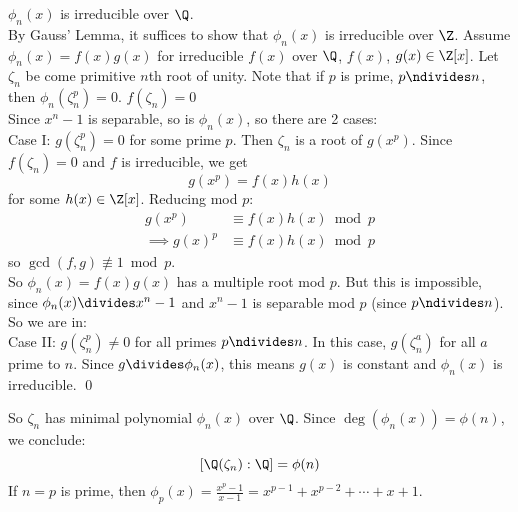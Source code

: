 \thm $\phi_n(x)$ is irreducible over $\Q$. \\
\pf By Gauss' Lemma, it suffices to show that $\phi_n(x)$ is irreducible over $\Z$.  Assume $\phi_n(x)=f(x)g(x)$ for irreducible $f(x)$ over $\Q$, $f(x)$, $g(x)\in\Z[x]$.  Let $\zeta_n$ be come primitive $n$th root of unity.  Note that if $p$ is prime, $p\ndivides n$, then $\phi_n(\zeta_n^p)=0$.  $f(\zeta_n)=0$ \\
Since $x^n-1$ is separable, so is $\phi_n(x)$, so there are 2 cases: \\
Case I: $g(\zeta_n^p)=0$ for some prime $p$.  Then $\zeta_n$ is a root of $g(x^p)$.  Since $f(\zeta_n)=0$ and $f$ is irreducible, we get
\[ g(x^p) = f(x)h(x) \]
for some $h(x)\in\Z[x]$.  Reducing mod $p$:
\begin{align*}
g(x^p) &\equiv f(x)h(x) \bmod p \\
\implies g(x)^p &\equiv f(x)h(x) \bmod p
\end{align*}
so $\gcd(f,g)\nequiv1\bmod p$. \\
So $\phi_n(x)=f(x)g(x)$ has a multiple root mod $p$.  But this is impossible, since $\phi_n(x)\divides x^n-1$ and $x^n-1$ is separable mod $p$ (since $p\ndivides n$).  So we are in: \\
Case II: $g(\zeta^p_n)\neq0$ for all primes $p\ndivides n$.  In this case, $g(\zeta_n^a)$ for all $a$ prime to $n$.  Since $g\divides\phi_n(x)$, this means $g(x)$ is constant and $\phi_n(x)$ is irreducible. \qed

So $\zeta_n$ has minimal polynomial $\phi_n(x)$ over $\Q$.  Since $\deg(\phi_n(x))=\phi(n)$, we conclude:
\[ [\Q(\zeta_n):\Q] = \phi(n) \]
%
If $n=p$ is prime, then $\phi_p(x)=\frac{x^p-1}{x-1}=x^{p-1}+x^{p-2}+\dotsb+x+1$.
